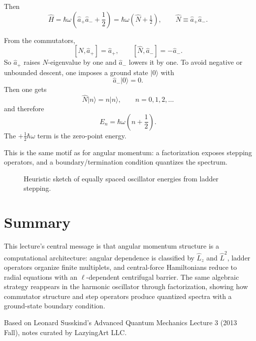 Then
\[
\hat H=\hbar\omega\left(\hat a_+\hat a_-+\frac12\right)
=\hbar\omega(\hat N+\tfrac12),
\qquad
\hat N\equiv \hat a_+\hat a_-.
\]

From the commutators,
\[
[\hat N,\hat a_+]=\hat a_+,\qquad [\hat N,\hat a_-]=-\hat a_-.
\]
So \(\hat a_+\) raises \(N\)-eigenvalue by one and \(\hat a_-\) lowers it by one. To avoid negative or unbounded descent, one imposes a ground state \(|0\rangle\) with
\[
\hat a_-|0\rangle=0.
\]
Then one gets
\[
\hat N|n\rangle=n|n\rangle,\qquad n=0,1,2,\ldots
\]
and therefore
\[
E_n=\hbar\omega\left(n+\frac12\right).
\]
The \(+\frac12\hbar\omega\) term is the zero-point energy.

This is the same motif as for angular momentum: a factorization exposes stepping operators, and a boundary/termination condition quantizes the spectrum.

\begin{figure}
\centering
{}
\caption{Heuristic sketch of equally spaced oscillator energies from ladder stepping.}
\end{figure}

\section{Summary}
This lecture’s central message is that angular momentum structure is a computational architecture: angular dependence is classified by \(\hat L_z\) and \(\hat L^2\), ladder operators organize finite multiplets, and central-force Hamiltonians reduce to radial equations with an \(\ell\)-dependent centrifugal barrier. The same algebraic strategy reappears in the harmonic oscillator through factorization, showing how commutator structure and step operators produce quantized spectra with a ground-state boundary condition.

Based on Leonard Susskind’s Advanced Quantum Mechanics Lecture 3 (2013 Fall), notes curated by LazyingArt LLC.
